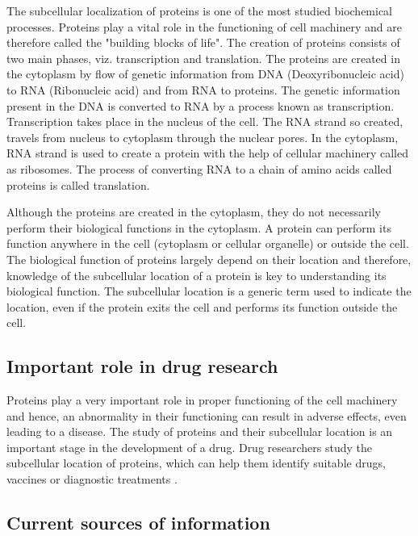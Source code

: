 The subcellular localization of proteins is one of the most studied biochemical processes. Proteins play a vital role in the functioning of cell machinery and are therefore called the "building blocks of life". The creation of proteins consists of two main phases, viz. transcription and translation. The proteins are created in the cytoplasm by flow of genetic information from DNA (Deoxyribonucleic acid) to RNA (Ribonucleic acid) and from RNA to proteins. The genetic information present in the DNA is converted to RNA by a process known as transcription. Transcription takes place in the nucleus of the cell. The RNA strand so created, travels from nucleus to cytoplasm through the nuclear pores. In the cytoplasm, RNA strand is used to create a protein with the help of cellular machinery called as ribosomes. The process of converting RNA to a chain of amino acids called proteins is called translation. 

Although the proteins are created in the cytoplasm, they do not necessarily perform their biological functions in the cytoplasm. A protein can perform its function anywhere in the cell (cytoplasm or cellular organelle) or outside the  cell. The biological function of proteins largely depend on their location and therefore, knowledge of the subcellular location of a protein is key to understanding its biological function. The subcellular location is a generic term used to indicate the location, even if the protein exits the cell and performs its  function outside the cell.

\subsection{Important role in drug research}

Proteins play a very important role in proper functioning of the cell machinery and hence, an abnormality in their functioning can result in adverse effects, even leading to a disease. The study of proteins and their subcellular location is an important stage in the development of a drug. Drug researchers study the subcellular location of proteins, which can help them identify suitable drugs, vaccines or diagnostic treatments \cite{liu2007exploiting}. 


\subsection{Current sources of information}

